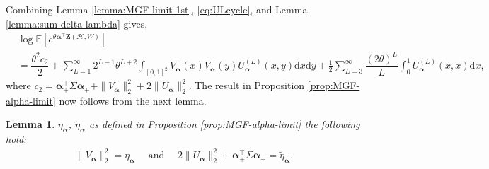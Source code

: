 \documentclass[11pt,reqno]{amsart}
\numberwithin{equation}{section}
\newtheorem{lemma}{Lemma}[section]
\theoremstyle{definition}
\begin{document}
Combining Lemma \ref{lemma:MGF-limit-1st}, \eqref{eq:ULcycle}, and Lemma \ref{lemma:sum-delta-lambda} gives, 
\begin{align*}
    & \log\mathbb{E}\left[ e^{\theta \bm{\alpha}^{\top}\bm{Z}(\bm{\mathcal{H}},W)} \right] \nonumber \\ 
    &= \dfrac{\theta^{2} c_2}{2}  + \sum_{L = 1}^{\infty} 2^{L-1}\theta^{L+2} \int_{[0, 1]^2} V_{\bm \alpha}(x)V_{\bm \alpha}(y)U_{\bm \alpha}^{(L)}(x,y)\mathrm{d}x\mathrm{d}y + \frac{1}{2}\sum_{L=3}^{\infty}\dfrac{\left(2 \theta\right)^{L}}{L} \int_{0}^{1} U_{\bm \alpha}^{(L)}(x, x)\mathrm{d}x , 
\end{align*}  
where $c_2 = \bm{\alpha}_{+}^{\top}\Sigma\bm{\alpha}_{+} + \|V_{\bm \alpha}\|_{2}^{2} + 2 \|U_{\bm \alpha}\|_{2}^{2}$.
The result in Proposition \ref{prop:MGF-alpha-limit} now follows from the next lemma.


\begin{lemma}\label{lemma:norm-U-2}
 $\eta_{\bm \alpha}$, $\tilde \eta_{\bm \alpha}$ as defined in Proposition \ref{prop:MGF-alpha-limit} the following hold: 
\begin{align*}
 \|V_{\bm \alpha}\|_{2}^{2} = \eta_{\bm \alpha} \quad \text{ and } \quad   2 \|U_{\bm \alpha} \|_{2}^{2} + \bm{\alpha}_{+}^{\top}\Sigma\bm{\alpha}_{+} = \tilde \eta_{\bm \alpha}  . 
\end{align*} 
\end{lemma}
\end{document}

